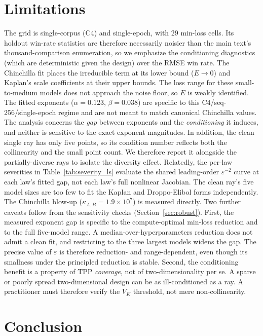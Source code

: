 \documentclass[11pt]{article}
\newcommand{\kAB}{\kappa_{A,B}}
\begin{document}
\section{Limitations}
\label{sec:limitations}

The grid is single-corpus (C4) and single-epoch, with $29$ min-loss cells. Its holdout win-rate
statistics are therefore necessarily noisier than the main text's thousand-comparison enumeration,
so we emphasize the conditioning diagnostics (which are deterministic given the design) over the
RMSE win rate. The Chinchilla fit places the irreducible term at its lower bound ($E\to0$) and
Kaplan's scale coefficients at their upper bounds. The loss range for these small-to-medium models
does not approach the noise floor, so $E$ is weakly identified. The fitted exponents
($\alpha=0.123$, $\beta=0.038$) are specific to this C4/seq-256/single-epoch regime and are not
meant to match canonical Chinchilla values. The analysis concerns the \emph{gap} between exponents
and the \emph{conditioning} it induces, and neither is sensitive to the exact exponent magnitudes.
In addition, the clean single ray has only five points, so its condition number reflects both the
collinearity and the small point count. We therefore report it alongside the partially-diverse
rays to isolate the diversity effect. Relatedly, the per-law severities in
Table~\ref{tab:severity_ls} evaluate the shared leading-order $\varepsilon^{-2}$ curve at each
law's fitted gap, not each law's full nonlinear Jacobian. The clean ray's five model sizes are too
few to fit the Kaplan and Droppo-Elibol forms independently. The Chinchilla blow-up
($\kAB=1.9\times10^{7}$) is measured directly. Two further caveats follow from the sensitivity
checks (Section~\ref{sec:robust}). First, the measured exponent gap is specific to the
compute-optimal min-loss reduction and to the full five-model range. A median-over-hyperparameters
reduction does not admit a clean fit, and restricting to the three largest models widens the gap.
The precise value of $\varepsilon$ is therefore reduction- and range-dependent, even though its
smallness under the principled reduction is stable. Second, the conditioning benefit is a property
of TPP \emph{coverage}, not of two-dimensionality per se. A sparse or poorly spread
two-dimensional design can be as ill-conditioned as a ray. A practitioner must therefore verify
the $V_K$ threshold, not mere non-collinearity.

\section{Conclusion}
\label{sec:conclusion}
\end{document}
